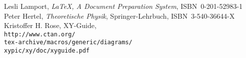 \begin{thebibliography}{99}
    Lesli Lamport, 
        \emph{\LaTeX, A Document Preparation System}, ISBN~0-201-52983-1
    Peter Hertel, 
        \emph{Theoretische Physik}, Springer-Lehrbuch, ISBN~3-540-36644-X
        Kristoffer H. Rose, XY-Guide,\\\texttt{http://www.ctan.org/\\
        tex-archive/macros/generic/diagrams/\\
        xypic/xy/doc/xyguide.pdf}
\end{thebibliography}